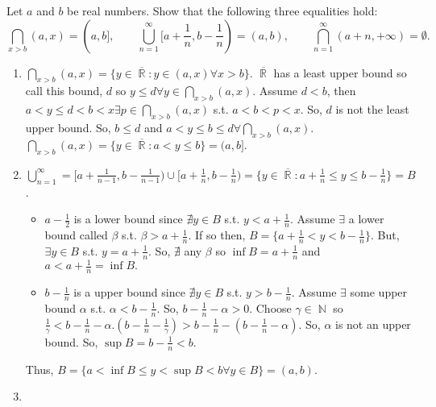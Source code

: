\documentclass[12pt,letterpaper,boxed]{hmcpset}
\DeclareMathOperator{\R}{\mathbb{R}}
\DeclareMathOperator{\N}{\mathbb{N}}
\begin{document}

\begin{problem}[Exercise 5.4.]
Let $a$ and $b$ be real numbers. Show that the following three equalities hold: $$\bigcap_{x > b}(a,x) = (a,b], \quad \quad \bigcup_{n=1}^{\infty}[a + \frac{1}{n}, b - \frac{1}{n})=(a,b), \quad \quad \bigcap_{n = 1}^{\infty}(a + n,+\infty) = \emptyset.$$
\end{problem}


\begin{solution}
\begin{enumerate}
	\itemsep0em
	\item $\bigcap_{x > b}(a,x) = \{y \in \overline{\R} : y \in (a, x) \forall x > b\}$. $\overline{\R}$ has a least upper bound so call this bound, $d$ so $y \leq d \forall y \in \bigcap_{x > b} (a, x)$. Assume $d < b$, then $a < y \leq d < b < x \exists p \in \bigcap_{x > b}(a,x)$ s.t. $a < b < p < x.$ So, $d$ is not the least upper bound. So, $b \leq d$ and $a < y \leq b \leq d \forall \bigcap_{x>b}(a, x)$. $\bigcap_{x>b}(a, x)=\{y \in \overline{\R} : a < y \leq b\} = (a, b].$
	\item $\bigcup_{n=1}^{\infty} = [a + \frac{1}{n - 1}, b - \frac{1}{n - 1}) \cup [a + \frac{1}{n}, b - \frac{1}{n}) = \{ y \in \overline{\R} : a + \frac{1}{n} \leq y \leq b - \frac{1}{n} \} = B$.
	\vspace{-2mm}
	\begin{itemize}
		\itemsep0em
		\item $a - \frac{1}{2}$ is a lower bound since $\nexists y \in B$ s.t. $y < a + \frac{1}{n}$. Assume $\exists$ a lower bound called $\beta$ s.t. $\beta > a + \frac{1}{n}.$ If so then, $B = \{a + \frac{1}{n} < y < b - \frac{1}{n} \}.$ But, $\exists y\in B$ s.t. $y = a + \frac{1}{n}.$ So, $\nexists $ any $\beta$ so $\inf B = a + \frac{1}{n}$ and $a < a + \frac{1}{n}=\inf B.$ 
		\item $b - \frac{1}{n}$ is a upper bound since $\nexists y \in B$ s.t. $y > b - \frac{1}{n}$. Assume $\exists$ some upper bound $\alpha$ s.t. $\alpha < b - \frac{1}{n}.$ So, $b - \frac{1}{n} - \alpha > 0.$ Choose $\gamma \in \N$ so $\frac{1}{\gamma} < b - \frac{1}{n} - \alpha. (b - \frac{1}{n} - \frac{1}{\gamma}) > b - \frac{1}{n} - (b - \frac{1}{n} - \alpha).$ So, $\alpha$ is not an upper bound. So, $\sup B = b - \frac{1}{n} < b.$ 
	\end{itemize} 
	Thus, $B = \{a < \inf B \leq y < \sup B < b \forall y \in B\} = (a,b)$.
	\item 
\end{enumerate}
\end{solution}
\end{document}
